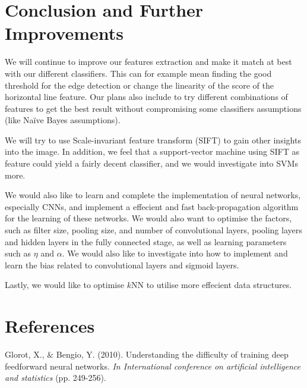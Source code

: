 \documentclass{article} %
\begin{document}
\section{Conclusion and Further Improvements}
We will continue to improve our features extraction and make it match at best with our different classifiers. This can for example mean finding the good threshold for the edge detection or change the linearity of the score of the horizontal line feature. Our plans also include to try different combinations of features to get the best result without compromising some classifiers assumptions (like Na\"ive Bayes assumptions).

We will try to use Scale-invariant feature transform (SIFT) to gain other insights into the image. In addition, we feel that a support-vector machine using SIFT as feature could yield a fairly decent classifier, and we would investigate into SVMs more.

We would also like to learn and complete the implementation of neural networks, especially CNNs, and implement a effecient and fast back-propagation algorithm for the learning of these networks. We would also want to optimise the factors, such as filter size, pooling size, and number of convolutional layers, pooling layers and hidden layers in the fully connected stage, as well as learning parameters such as $\eta$ and $\alpha$. We would also like to investigate into how to implement and learn the bias related to convolutional layers and sigmoid layers.

Lastly, we would like to optimise $k$NN to utilise more effecient data structures.



\section{References}
\small{
Glorot, X., \& Bengio, Y. (2010). Understanding the difficulty of training deep feedforward neural networks. \textit{In International conference on artificial intelligence and statistics} (pp. 249-256).
}
\end{document}
